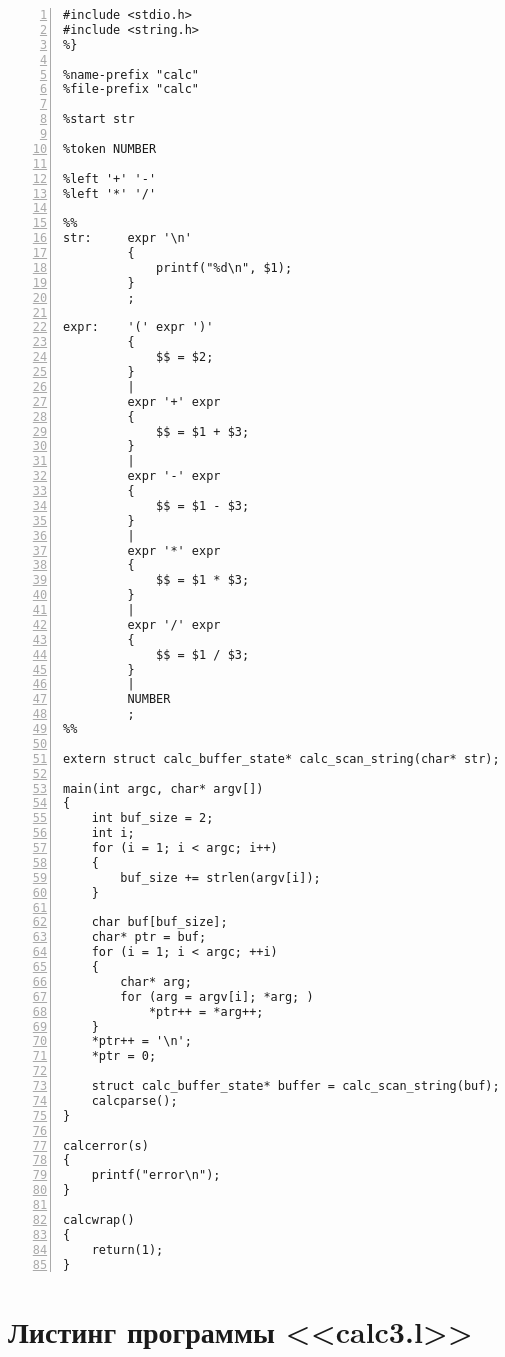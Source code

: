 \documentclass[bachelor, och, coursework, times]{SCWorks}
\begin{document}
\begin{Verbatim}[fontsize=\small, numbers=left]
%{
#include <stdio.h>
#include <string.h>
%}

%name-prefix "calc"
%file-prefix "calc"

%start str

%token NUMBER

%left '+' '-'
%left '*' '/'

%%   
str:     expr '\n'
         {
             printf("%d\n", $1);
         }
         ;

expr:    '(' expr ')'
         {
             $$ = $2;
         }
         |
         expr '+' expr
         {
             $$ = $1 + $3;
         }
         |
         expr '-' expr
         {
             $$ = $1 - $3;
         }
         |
         expr '*' expr
         {
             $$ = $1 * $3;
         }
         |
         expr '/' expr
         {
             $$ = $1 / $3;
         }
         |
         NUMBER
         ;      
%%

extern struct calc_buffer_state* calc_scan_string(char* str);

main(int argc, char* argv[])
{
	int buf_size = 2;
	int i;
	for (i = 1; i < argc; i++)
	{
		buf_size += strlen(argv[i]);
	}

	char buf[buf_size];
	char* ptr = buf;
	for (i = 1; i < argc; ++i)
	{
		char* arg;
		for (arg = argv[i]; *arg; )
			*ptr++ = *arg++;
	}
	*ptr++ = '\n';
	*ptr = 0;

	struct calc_buffer_state* buffer = calc_scan_string(buf);
	calcparse();
}

calcerror(s)
{
	printf("error\n");
}

calcwrap()
{
	return(1);
}
\end{Verbatim}



\section{Листинг программы <<calc3.l>>}\label{pril-6}
\end{document}
